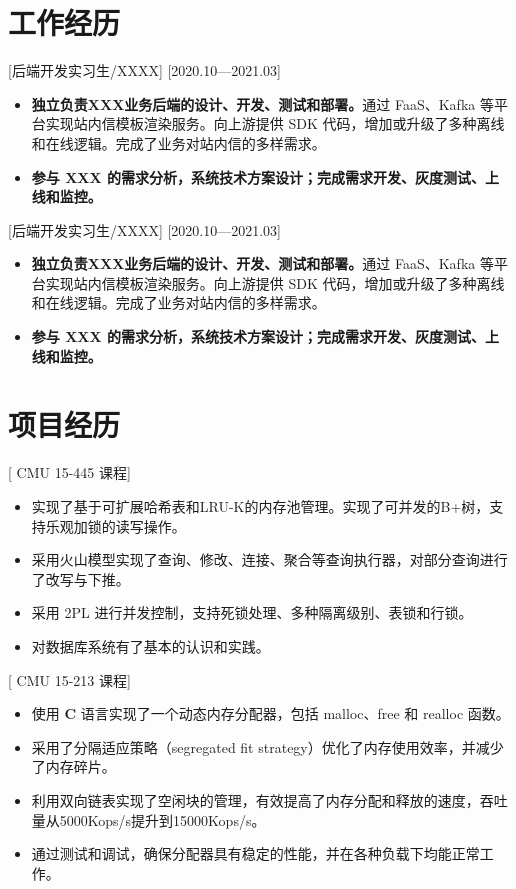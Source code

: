 \documentclass{resume}
\begin{document}
\section{工作经历}

[后端开发实习生/XXXX]
[2020.10—2021.03]

\begin{itemize}
  \item \textbf{独立负责XXX业务后端的设计、开发、测试和部署。}通过 FaaS、Kafka 等平台实现站内信模板渲染服务。向上游提供 SDK 代码，增加或升级了多种离线和在线逻辑。完成了业务对站内信的多样需求。
  \item \textbf{参与 XXX 的需求分析，系统技术方案设计；完成需求开发、灰度测试、上线和监控。}
\end{itemize}

[后端开发实习生/XXXX]
[2020.10—2021.03]

\begin{itemize}
  \item \textbf{独立负责XXX业务后端的设计、开发、测试和部署。}通过 FaaS、Kafka 等平台实现站内信模板渲染服务。向上游提供 SDK 代码，增加或升级了多种离线和在线逻辑。完成了业务对站内信的多样需求。
  \item \textbf{参与 XXX 的需求分析，系统技术方案设计；完成需求开发、灰度测试、上线和监控。}
\end{itemize}

\section{项目经历}

[ \textnormal{CMU 15-445} 课程]
\begin{itemize}
  \item 实现了基于可扩展哈希表和LRU-K的内存池管理。实现了可并发的B+树，支持乐观加锁的读写操作。
  \item 采用火山模型实现了查询、修改、连接、聚合等查询执行器，对部分查询进行了改写与下推。
  \item 采用 2PL 进行并发控制，支持死锁处理、多种隔离级别、表锁和行锁。
  \item 对数据库系统有了基本的认识和实践。
\end{itemize}

[ \textnormal{CMU 15-213} 课程]
\begin{itemize}
  \item 使用 \textbf{C} 语言实现了一个动态内存分配器，包括 malloc、free 和 realloc 函数。
  \item 采用了分隔适应策略（segregated fit strategy）优化了内存使用效率，并减少了内存碎片。
  \item 利用双向链表实现了空闲块的管理，有效提高了内存分配和释放的速度，吞吐量从5000Kops/s提升到15000Kops/s。
  \item 通过测试和调试，确保分配器具有稳定的性能，并在各种负载下均能正常工作。
\end{itemize}
\end{document}
